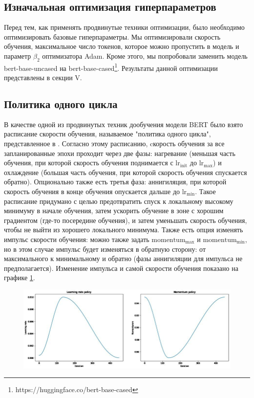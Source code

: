 \documentclass[conference]{IEEEtran}
\begin{document}
\subsection{Изначальная оптимизация гиперпараметров}
Перед тем, как применять продвинутые техники оптимизации, было необходимо оптимизировать базовые гиперпараметры. Мы оптимизировали скорость обучения, максимальное число токенов, которое можно пропустить в модель и параметр $\beta_2$ оптимизатора Adam. Кроме этого, мы попробовали заменить модель bert-base-uncased на bert-base-cased\footnote{https://huggingface.co/bert-base-cased}. Результаты данной оптимизации представлены в секции V.

\subsection{Политика одного цикла}
В качестве одной из продвинутых техник дообучения модели BERT было взято расписание скорости обучения, называемое "политика одного цикла", представленное в \cite{one-cycle-policy}. Согласно этому расписанию, cкорость обучения за все запланированные эпохи проходит через две фазы: нагревание (меньшая часть обучения, при которой скорость обучения поднимается с $\text{lr}_\text{init}$ до $\text{lr}_\text{max}$) и охлаждение (большая часть обучения, при которой скорость обучения спускается обратно). Опционально также есть третья фаза: аннигиляция, при которой скорость обучения в конце обучения опускается дальше до $\text{lr}_\text{min}$. Такое расписание придумано с целью предотвратить спуск к локальному высокому минимуму в начале обучения, затем ускорить обучение в зоне с хорошим градиентом (где-то посередине обучения), и затем уменьшать скорость обучения, чтобы не выйти из хорошего локального минимума. Также есть опция изменять импульс скорости обучения: можно также задать $\text{momentum}_\text{max}$ и $\text{momentum}_\text{min}$, но в этом случае импульс будет изменяться в обратную сторону: от максимального к минимальному и обратно (фазы аннигиляции для импульса не предполагается). Изменение импульса и самой скорости обучения показано на графике \ref{fig:one-cycle-policy}.
\begin{figure}[h!]
    \centering
    \includegraphics*[width=\linewidth]{one-cycle-policy.jpg}
    \caption{}
    \label{fig:one-cycle-policy}
\end{figure}
\end{document}
